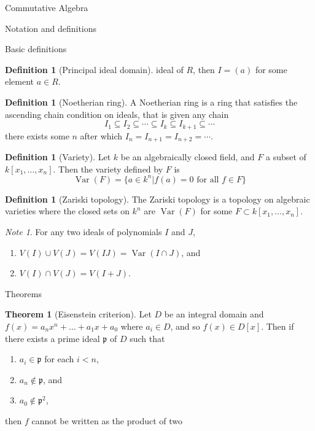 \documentclass{article}
\theoremstyle{definition}
\newtheorem{theorem}{Theorem}
\numberwithin{theorem}{subsection} %
\theoremstyle{remark}
\newtheorem*{remark}{Note}
\theoremstyle{definition}
\newtheorem{definition}[paragraph]{Definition}
\newcommand{\Var}{\operatorname{Var}}
\newcommand{\set}[1]{\{#1\}}
\begin{document}
\begin{section}{Commutative Algebra}
\begin{subsection}{Notation and definitions}
\begin{subsubsection}{Basic definitions}
\begin{definition}[Principal ideal domain]
        ideal of $R$, then $I = (a)$ for some element $a \in R$.
      \end{definition}
      \begin{definition}[Noetherian ring]
        A Noetherian ring is a ring that satisfies the ascending chain condition
        on ideals, that is given any chain \[
          I_1 \subseteq I_2 \subseteq \cdots \subseteq I_k \subseteq I_{k+1} \subseteq \cdots
        \] there exists some $n$ after which $I_n = I_{n+1} = I_{n+2} = \cdots$.
      \end{definition}
      \begin{definition}[Variety]
        Let $k$ be an algebraically closed field, and $F$ a subset of $k[x_1, \hdots, x_n]$.
        Then the variety defined by $F$ is \[
          \Var(F) = \set{a \in k^n | f(a) = 0 \text{ for all } f \in F}
        \]
      \end{definition}
      \begin{definition}[Zariski topology]
        The Zariski topology is a topology on algebraic varieties where the
        closed sets on $k^n$ are $\Var(F)$ for some $F \subset k[x_1, \hdots, x_n]$.
      \end{definition}
      \begin{remark}
        For any two ideals of polynomials $I$ and $J$, \begin{enumerate}
          \item $V(I) \cup V(J) = V(IJ) = \Var(I \cap J)$, and
          \item $V(I) \cap V(J) = V(I + J)$.
        \end{enumerate}
      \end{remark}
    \end{subsubsection}
  \end{subsection}
  \begin{subsection}{Theorems}
    \begin{theorem}[Eisenstein criterion]
      Let $D$ be an integral domain and $f(x) = a_nx^n + \hdots + a_1x + a_0$
      where $a_i \in D$, and so $f(x) \in D[x]$. Then if there exists a prime
      ideal $\mathfrak p$ of $D$ such that \begin{enumerate}
        \item $a_i \in \mathfrak p$ for each $i < n$,
        \item $a_n \not\in \mathfrak p$, and
        \item $a_0 \not\in \mathfrak p^2$,
      \end{enumerate} then $f$ cannot be written as the product of two

\end{theorem}
\end{subsection}
\end{section}
\end{document}
